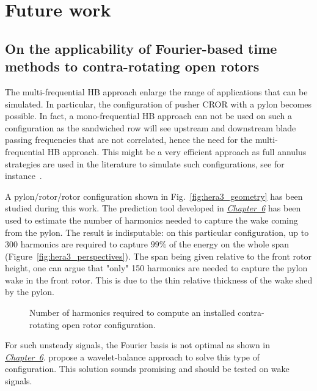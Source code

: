 \section*{Future work}

\subsection*{On the applicability of Fourier-based time methods to contra-rotating open rotors}

The multi-frequential HB approach enlarge the range
of applications that can be simulated. In particular, 
the configuration of pusher CROR with a pylon becomes possible.
In fact, a mono-frequential HB approach can not be
used on such a configuration as the sandwiched row will see upstream
and downstream
blade passing frequencies that are not correlated, hence
the need for the multi-frequential HB approach.
This might be a very efficient approach as full annulus
strategies are used in the literature to simulate such
configurations, see for instance~\citet{Stuermer2008}.

A pylon/rotor/rotor configuration shown in Fig.~\ref{fig:hera3_geometry}
has been studied during this work.
The prediction tool developed in
\hyperref[cha:limitations_convergence]{\emph{Chapter~6}}
has been used to estimate the number
of harmonics needed to capture the wake coming from the pylon.
The result is indisputable: on this particular configuration,
up to 300 harmonics are required to capture $99\%$ of the energy
on the whole span (Figure~\ref{fig:hera3_perspectives}). 
The span being given relative to the front
rotor height, one can argue that "only" 150 harmonics are
needed to capture the pylon wake in the front rotor.
This is due to the thin relative thickness of the
wake shed by the pylon.
\begin{figure}[htp]
  \centering
  \caption{Number of harmonics required to compute an 
  installed contra-rotating open rotor configuration.}
\end{figure}

For such unsteady signals, the Fourier basis
is not optimal as shown in 
\hyperref[cha:limitations_convergence]{\emph{Chapter~6}}.
\citet{Li2002} propose a wavelet-balance approach to
solve this type of configuration. This
solution sounds promising and should be tested on
wake signals. 

